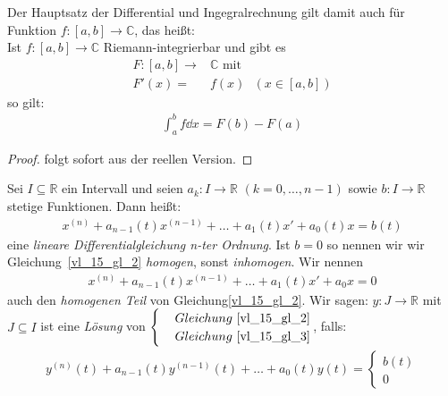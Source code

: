 \begin{Bemerkung}{
	Der Hauptsatz der Differential und Ingegralrechnung gilt damit auch für 
	Funktion $f: [a,b] \rightarrow \mathbb{C}$, das heißt: \\
	Ist $f:[a,b] \rightarrow \mathbb{C}$ Riemann-integrierbar und gibt es 
	\begin{align*}
		F: [a,b] \rightarrow & \mathbb{C} \text{ mit} \\
		F'(x) = & f(x)\text{ }(x \in [a,b])
	\end{align*}
	so gilt:
	\begin{align*}
		\int_a^b f \dd{x} = F(b) -F(a)
	\end{align*}
}\end{Bemerkung}
\begin{proof}
folgt sofort aus der reellen Version.
\end{proof}

\begin{Definition}{
	Sei $I \subseteq \mathbb{R}$ ein Intervall und seien $a_k: I \rightarrow 
	\mathbb{R}$ $(k = 0, \hdots, n-1)$ sowie $b: I \rightarrow \mathbb{R}$ 
	stetige Funktionen. Dann heißt:
	\begin{align}\label{vl_15_gl_2}
		x^{(n)} + a_{n-1}(t)x^{(n-1)} + \hdots + a_1(t)x' + a_0(t)x = 
		b(t)
	\end{align}
	eine \emph{lineare Differentialgleichung n-ter Ordnung}.
	Ist $b= 0$ so nennen wir wir Gleichung~\ref{vl_15_gl_2} \emph{homogen}, 
	sonst \emph{inhomogen}. Wir nennen 
	\begin{align}\label{vl_15_gl_3}
		x^{(n)} + a_{n-1}(t)x^{(n-1)} + \hdots + a_1(t)x' + a_0x = 0
	\end{align}
	auch den \emph{homogenen Teil} von Gleichung\ref{vl_15_gl_2}. Wir sagen:
	$y: J \rightarrow \mathbb{R}$ mit $J \subseteq I$ ist eine \emph{Lösung} von 
	$\begin{cases} & Gleichung~\ref{vl_15_gl_2} \\  & Gleichung~\ref{vl_15_gl_3} 
	\end{cases}$, falls:
	\begin{align*}
	y^{(n)}(t) + a_{n-1}(t)y^{(n-1)}(t) + \hdots + a_0(t)y(t) = 
	\begin{cases} b(t) \\ 0 \end{cases}
	\end{align*}

}\end{Definition}

